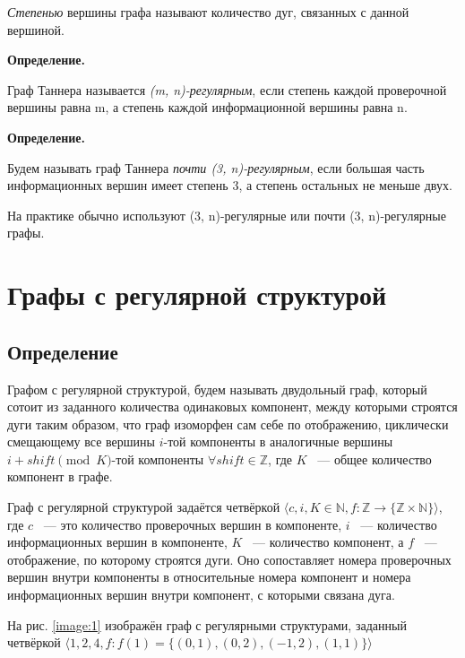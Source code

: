 \documentclass[14pt]{mmcs-article}
\begin{document}
\textsl{Степенью} вершины графа называют количество дуг, связанных с данной вершиной.

\textbf{Определение.}

Граф Таннера называется \textsl{(m, n)-регулярным}, если степень каждой проверочной вершины равна m, а степень каждой информационной вершины равна n.

\textbf{Определение.}

Будем называть граф Таннера \textsl{почти (3, n)-регулярным}, если большая часть информационных вершин имеет степень 3, а степень остальных не меньше двух.

На практике обычно используют (3, n)-регулярные или почти (3, n)-регулярные графы.

\newpage

\section{Графы с регулярной структурой}

\subsection{Определение}

Графом с регулярной структурой, будем называть двудольный граф, который сотоит из заданного количества одинаковых компонент, между которыми строятся дуги таким образом, что граф изоморфен сам себе по отображению, циклически смещающему все вершины $i$-той компоненты в аналогичные вершины $i + shift \pmod K$-той компоненты $\forall shift \in \mathbb{Z}$, где $K$ ~--- общее количество компонент в графе.

Граф с регулярной структурой задаётся четвёркой $\langle c, i, K \in \mathbb{N}, f: \mathbb{Z} \rightarrow \{ \mathbb{Z} \times \mathbb{N} \} \rangle$, где $c$ ~--- это количество проверочных вершин в компоненте, $i$ ~--- количество информационных вершин в компоненте, $K$ ~--- количество компонент, а $f$ ~--- отображение, по которому строятся дуги. Оно сопоставляет номера проверочных вершин внутри компоненты в относительные номера компонент и номера информационных вершин внутри компонент, с которыми связана дуга.

На рис. \ref{image:1} изображён граф с регулярными структурами, заданный четвёркой $\langle 1, 2, 4, f: f(1) = \{ (0, 1), (0, 2), (-1, 2), (1, 1) \} \rangle$
\end{document}
